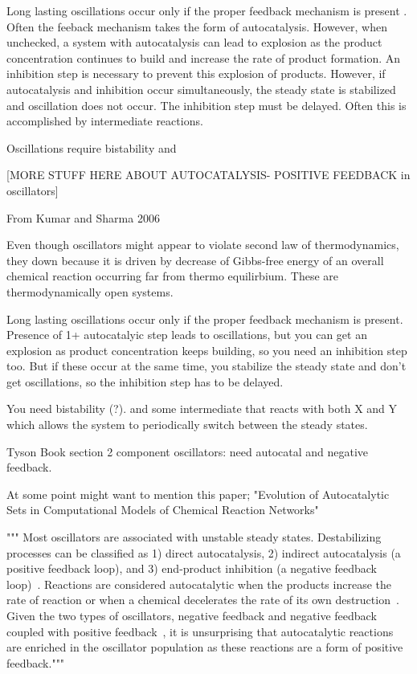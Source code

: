 \documentclass[12pt]{report}
\begin{document}
Long lasting oscillations occur only if the proper feedback mechanism is present \cite{Sharma2006}. Often the feeback mechanism takes the form of autocatalysis. However, when unchecked, a system with autocatalysis can lead to explosion as the product concentration continues to build and increase the rate of product formation. An inhibition step is necessary to prevent this explosion of products. However, if autocatalysis and inhibition occur simultaneously, the steady state is stabilized and oscillation does not occur. The inhibition step must be delayed. Often this is accomplished by intermediate reactions. 

Oscillations require bistability and 

[MORE STUFF HERE ABOUT AUTOCATALYSIS- POSITIVE FEEDBACK in oscillators]

From Kumar and Sharma 2006

Even though oscillators might appear to violate second law of thermodynamics, they down because it is driven by decrease of Gibbs-free energy of an overall chemical reaction occurring far from thermo equilirbium.  These are thermodynamically open systems.

Long lasting oscillations occur only if the proper feedback mechanism is present.
Presence of 1+ autocatalyic step leads to oscillations, but you can get an explosion as product concentration keeps building, so you need an inhibition step too. But if these occur at the same time, you stabilize the steady state and don't get oscillations, so the inhibition step has to be delayed.

You need bistability (?). and some intermediate that reacts with both X and Y which allows the system to periodically switch between the steady states.

Tyson Book section
2 component oscillators: need autocatal and negative feedback. 

At some point might want to mention this paper; "Evolution of Autocatalytic Sets in Computational Models
of Chemical Reaction Networks"

"""
Most oscillators are associated with unstable steady states. Destabilizing processes can be classified as 1) direct autocatalysis, 2) indirect autocatalysis (a positive feedback loop), and 3) end-product inhibition (a negative feedback loop)~\cite{Tyson1975, tyson2007}. Reactions are considered autocatalytic when the products increase the rate of reaction or when a chemical decelerates the rate of its own destruction~\cite{Tyson2004}. Given the two types of oscillators, negative feedback and negative feedback coupled with positive feedback~\cite{Sauro_dynamics}, it is unsurprising that autocatalytic reactions are enriched in the oscillator population as these reactions are a form of positive feedback."""
\end{document}
